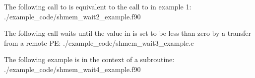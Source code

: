 \begin{apidefinition}
\begin{apiexamples}
\apifexample
{ The following call to  is  equivalent to the
call to  in example 1:}
{./example_code/shmem_wait2_example.f90}
{}

\apicexample
{The following \CorCpp{} call waits until the value in  is set to
be less than zero by a transfer from a remote PE:}
{./example_code/shmem_wait3_example.c}
{}

\apifexample
{The following \Fortran example is in the context of a subroutine:}
{./example_code/shmem_wait4_example.f90}
{}

\end{apiexamples}

\end{apidefinition}
